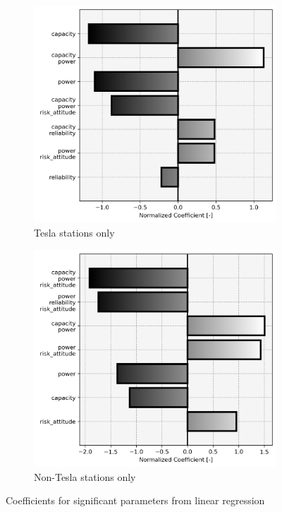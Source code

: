 \begin{figure}[H]
\begin{subfigure}[t]{.33\linewidth}
	\includegraphics[width = \linewidth]{figs/significant_parameters_1.png}
	\caption{Tesla stations only}
\end{subfigure}%
\begin{subfigure}[t]{.33\linewidth}
	\centering\captionsetup{width = .8\linewidth}
	\includegraphics[width = \linewidth]{figs/significant_parameters_2.png}
	\caption{Non-Tesla stations only}
\end{subfigure}

\caption{Coefficients for significant parameters from linear regression}
\label{fig:significant_parameters_0}

\end{figure}

